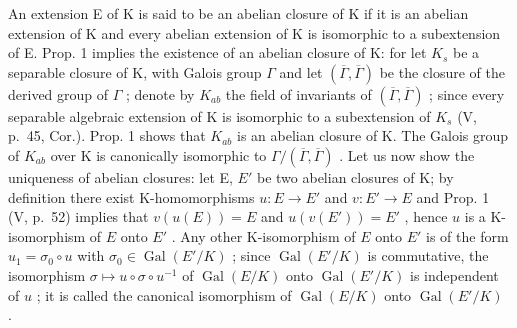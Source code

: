 An extension E of K is said to be an abelian closure of K if it is an abelian extension of K and every abelian extension of K is isomorphic to a subextension of E. Prop. 1 implies the existence of an abelian closure of K: for let \(K_{s}\) be a separable closure of K, with Galois group \(\Gamma\) and let \((\overline{\Gamma},\overline{\Gamma})\) be the closure of the derived group of \(\Gamma\) ; denote by \(K_{ab}\) the field of invariants of \((\overline{\Gamma},\overline{\Gamma})\) ; since every separable algebraic extension of K is isomorphic to a subextension of \(K_{s}\) (V, p.~45, Cor.). Prop. 1 shows that \(K_{ab}\) is an abelian closure of K. The Galois group of \(K_{ab}\) over K is canonically isomorphic to \(\Gamma/(\overline{\Gamma},\overline{\Gamma})\) . Let us now show the uniqueness of abelian closures: let E, \(E'\) be two abelian closures of K; by definition there exist K-homomorphisms \(u:E\to E'\) and \(v:E'\to E\) and Prop. 1 (V, p.~52) implies that \(v(u(E)) = E\) and \(u(v(E')) = E'\) , hence \(u\) is a K-isomorphism of \(E\) onto \(E'\) . Any other K-isomorphism of \(E\) onto \(E'\) is of the form \(u_1 = \sigma_0 \circ u\) with \(\sigma_0 \in \operatorname{Gal}(E'/K)\) ; since \(\operatorname{Gal}(E'/K)\) is commutative, the isomorphism \(\sigma \mapsto u \circ \sigma \circ u^{-1}\) of \(\operatorname{Gal}(E/K)\) onto \(\operatorname{Gal}(E'/K)\) is independent of \(u\) ; it is called the canonical isomorphism of \(\operatorname{Gal}(E/K)\) onto \(\operatorname{Gal}(E'/K)\) .

